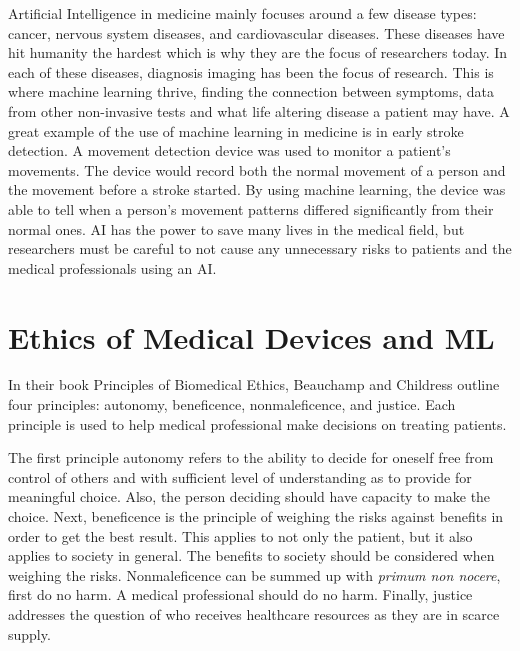 \documentclass[]{article}
\begin{document}
		Artificial Intelligence in medicine mainly focuses around a few disease types: cancer, nervous system diseases, and cardiovascular diseases. These diseases have hit humanity the hardest which is why they are the focus of researchers today. In each of these diseases, diagnosis imaging has been the focus of research. This is where machine learning thrive, finding the connection between symptoms, data from other non-invasive tests and what life altering disease a patient may have. A great example of the use of machine learning in medicine is in early stroke detection. A movement detection device was used to monitor a patient’s movements. The device would record both the normal movement of a person and the movement before a stroke started. By using machine learning, the device was able to tell when a person’s movement patterns differed significantly from their normal ones. AI has the power to save many lives in the medical field, but researchers must be careful to not cause any unnecessary risks to patients and the medical professionals using an AI.\cite{Jiang230}
		
	\section{Ethics of Medical Devices and ML}\label{ethics}

		In their book Principles of Biomedical Ethics, Beauchamp and Childress outline four principles: autonomy, beneficence, nonmaleficence, and justice. Each principle is used to help medical professional make decisions on treating patients.

		The first principle autonomy refers to the ability to decide for oneself free from control of others and with sufficient level of understanding as to provide for meaningful choice. Also, the person deciding should have capacity to make the choice. Next, beneficence is the principle of weighing the risks against benefits in order to get the best result. This applies to not only the patient, but it also applies to society in general. The benefits to society should be considered when weighing the risks. Nonmaleficence can be summed up with \emph{primum non nocere}, first do no harm. A medical professional should do no harm. Finally, justice addresses the question of who receives healthcare resources as they are in scarce supply.\cite{lawrence2007four}
\end{document}
